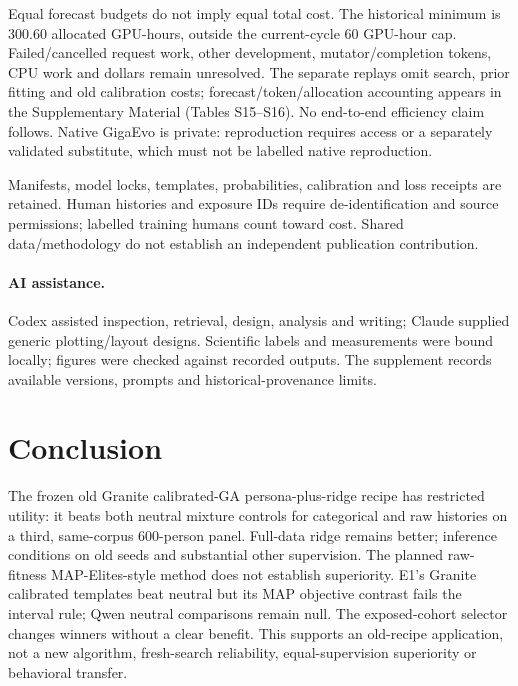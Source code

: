 \documentclass[sigconf,anonymous]{aamas}
\begin{document}
Equal forecast budgets do not imply equal total cost. The historical minimum
is 300.60 allocated GPU-hours, outside the current-cycle 60 GPU-hour cap. Failed/cancelled request work, other
development, mutator/completion tokens, CPU work and dollars remain unresolved.
The separate replays omit search, prior fitting and old calibration costs;
forecast/token/allocation accounting appears in the Supplementary Material (Tables S15--S16). No end-to-end efficiency claim follows. Native
GigaEvo is private: reproduction requires access or a separately validated
substitute, which must not be labelled native reproduction.

Manifests, model locks, templates, probabilities, calibration and loss receipts
are retained. Human histories and exposure IDs require de-identification and
source permissions; labelled training humans count toward cost. Shared
data/methodology do not establish an independent publication contribution.

\paragraph{AI assistance.}
Codex assisted inspection, retrieval, design, analysis and writing; Claude
supplied generic plotting/layout designs. Scientific labels and measurements
were bound locally; figures were checked against recorded outputs. The supplement records available versions, prompts and
historical-provenance limits.

\section{Conclusion}
The frozen old Granite calibrated-GA persona-plus-ridge recipe has restricted
utility: it beats both neutral mixture controls for categorical and raw
histories on a third, same-corpus 600-person panel. Full-data ridge remains
better; inference conditions on old seeds and substantial other supervision.
The planned raw-fitness MAP-Elites-style method does not establish superiority.
E1's Granite calibrated templates beat neutral but its MAP objective contrast fails the
interval rule; Qwen neutral comparisons remain null. The exposed-cohort selector
changes winners without a clear benefit. This supports an old-recipe
application, not a new algorithm, fresh-search reliability, equal-supervision
superiority or behavioral transfer.



\end{document}
